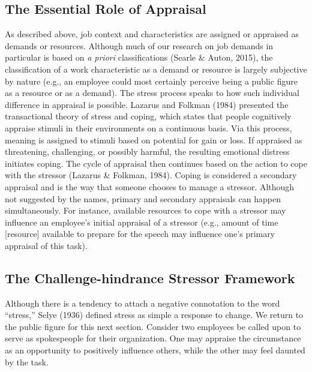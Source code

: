 \documentclass[
  english,
  man]{apa6}
\begin{document}
\hypertarget{the-essential-role-of-appraisal}{%
\subsection{The Essential Role of Appraisal}\label{the-essential-role-of-appraisal}}

As described above, job context and characteristics are assigned or appraised as demands or resources. Although much of our research on job demands in particular is based on \emph{a priori} classifications (Searle \& Auton, 2015), the classification of a work characteristic as a demand or resource is largely subjective by nature (e.g., an employee could most certainly perceive being a public figure as a resource or as a demand). The stress process speaks to how such individual difference in appraisal is possible. Lazarus and Folkman (1984) presented the transactional theory of stress and coping, which states that people cognitively appraise stimuli in their environments on a continuous basis. Via this process, meaning is assigned to stimuli based on potential for gain or loss. If appraised as threatening, challenging, or possibly harmful, the resulting emotional distress initiates coping. The cycle of appraisal then continues based on the action to cope with the stressor (Lazarus \& Folkman, 1984). Coping is considered a secondary appraisal and is the way that someone chooses to manage a stressor. Although not suggested by the names, primary and secondary appraisals can happen simultaneously. For instance, available resources to cope with a stressor may influence an employee's initial appraisal of a stressor (e.g., amount of time {[}resource{]} available to prepare for the speech may influence one's primary appraisal of this task).

\hypertarget{the-challenge-hindrance-stressor-framework}{%
\subsection{The Challenge-hindrance Stressor Framework}\label{the-challenge-hindrance-stressor-framework}}

Although there is a tendency to attach a negative connotation to the word ``stress,'' Selye (1936) defined stress as simple a response to change. We return to the public figure for this next section. Consider two employees be called upon to serve as spokespeople for their organization. One may appraise the circumstance as an opportunity to positively influence others, while the other may feel daunted by the task.
\end{document}
